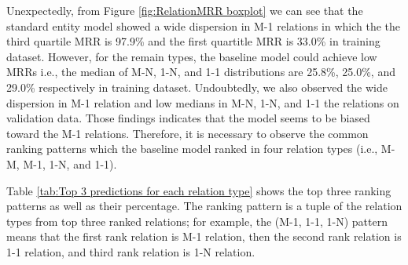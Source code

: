 Unexpectedly, from Figure \ref{fig:RelationMRR boxplot} we can see that the standard entity model showed a wide dispersion in M-1 relations in which the the third quartile MRR is 97.9\% and the first quartitle MRR is 33.0\% in training dataset. However, for the remain types, the baseline model could achieve low MRRs i.e., the median of M-N, 1-N, and 1-1 distributions are 25.8\%, 25.0\%, and 29.0\% respectively in training dataset. Undoubtedly, we also observed the wide dispersion in M-1 relation and low medians in M-N, 1-N, and 1-1 the relations on validation data. Those findings indicates that the model seems to be biased toward the M-1 relations. Therefore, it is necessary to observe the common ranking patterns which the baseline model ranked in four relation types (i.e., M-M, M-1, 1-N, and 1-1).

Table \ref{tab:Top 3 predictions for each relation type} shows the top three ranking patterns as well as their percentage. The ranking pattern is a tuple of the relation types from top three ranked relations; for example, the (M-1, 1-1, 1-N) pattern means that the first rank relation is M-1 relation, then the second rank relation is 1-1 relation, and third rank relation is 1-N relation.  

\begin{table}[!htbp]
\centering
{}
\caption{Three top-3 predictions for each relation type (training)}
\label{tab:Top 3 predictions for each relation type}
\end{table}
   

